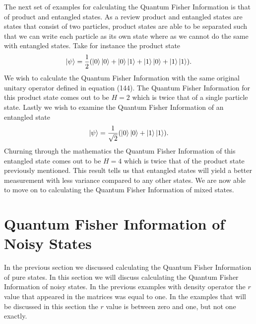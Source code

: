 \documentclass[twocolumn]{article}
\begin{document}
The next set of examples for calculating the Quantum Fisher Information is that of product and entangled states. As a review product and entangled states are states that consist of two particles, product states are able to be separated such that we can write each particle as its own state where as we cannot do the same with entangled states. Take for instance the product state 
\begin{equation}
\ket{\psi}=\frac{1}{2}(\ket{0}\ket{0}+\ket{0}\ket{1}+\ket{1}\ket{0}+\ket{1}\ket{1}).
\end{equation}
We wish to calculate the Quantum Fisher Information with the same original unitary operator defined in equation (144). The Quantum Fisher Information for this product state comes out to be $H=2$ which is twice that of a single particle state. Lastly we wish to examine the Quantum Fisher Information of an entangled state
\begin{equation}
\ket{\psi}=\frac{1}{\sqrt{2}}(\ket{0}\ket{0}+\ket{1}\ket{1}).
\end{equation}
Churning through the mathematics the Quantum Fisher Information of this entangled state comes out to be $H=4$ which is twice that of the product state previously mentioned. This result tells us that entangled states will yield a better measurement with less variance compared to any other states. We are now able to move on to calculating the Quantum Fisher Information of mixed states.
\section*{Quantum Fisher Information of Noisy States}
In the previous section we discussed calculating the Quantum Fisher Information of pure states. In this section we will discuss calculating the Quantum Fisher Information of noisy states. In the previous examples with density operator the $r$ value that appeared in the matrices was equal to one. In the examples that will be discussed in this section the $r$ value is between zero and one, but not one exactly.
\end{document}
